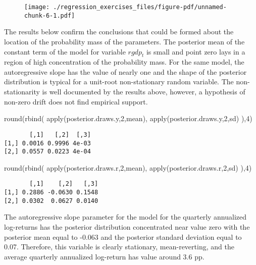 \documentclass[
  letterpaper,
  DIV=11,
  numbers=noendperiod]{scrreprt}
\newenvironment{Shaded}{\begin{snugshade}}{\end{snugshade}}
\newcommand{\DecValTok}[1]{\textcolor[rgb]{0.68,0.00,0.00}{#1}}
\newcommand{\FunctionTok}[1]{\textcolor[rgb]{0.28,0.35,0.67}{#1}}
\newcommand{\NormalTok}[1]{\textcolor[rgb]{0.00,0.23,0.31}{#1}}
\begin{document}
\begin{figure}[H]

{\centering \texttt{[image: ./regression\_exercises\_files/figure-pdf/unnamed-chunk-6-1.pdf]}

}

\end{figure}

The results below confirm the conclusions that could be formed about the
location of the probability mass of the parameters. The posterior mean
of the constant term of the model for variable \(rgdp_t\) is small and
point zero lays in a region of high concentration of the probability
mass. For the same model, the autoregressive slope has the value of
nearly one and the shape of the posterior distribution is typical for a
unit-root non-stationary random variable. The non-stationarity is well
documented by the results above, however, a hypothesis of non-zero drift
does not find empirical support.

\begin{Shaded}
\begin{Highlighting}[]
\FunctionTok{round}\NormalTok{(}\FunctionTok{rbind}\NormalTok{(}
  \FunctionTok{apply}\NormalTok{(posterior.draws.y,}\DecValTok{2}\NormalTok{,mean),}
  \FunctionTok{apply}\NormalTok{(posterior.draws.y,}\DecValTok{2}\NormalTok{,sd)}
\NormalTok{),}\DecValTok{4}\NormalTok{)}
\end{Highlighting}
\end{Shaded}

\begin{verbatim}
       [,1]   [,2]  [,3]
[1,] 0.0016 0.9996 4e-03
[2,] 0.0557 0.0223 4e-04
\end{verbatim}

\begin{Shaded}
\begin{Highlighting}[]
\FunctionTok{round}\NormalTok{(}\FunctionTok{rbind}\NormalTok{(}
  \FunctionTok{apply}\NormalTok{(posterior.draws.r,}\DecValTok{2}\NormalTok{,mean),}
  \FunctionTok{apply}\NormalTok{(posterior.draws.r,}\DecValTok{2}\NormalTok{,sd)}
\NormalTok{),}\DecValTok{4}\NormalTok{)}
\end{Highlighting}
\end{Shaded}

\begin{verbatim}
       [,1]    [,2]   [,3]
[1,] 0.2886 -0.0630 0.1548
[2,] 0.0302  0.0627 0.0140
\end{verbatim}

The autoregressive slope parameter for the model for the quarterly
annualized log-returns has the posterior distribution concentrated near
value zero with the posterior mean equal to -0.063 and the posterior
standard deviation equal to 0.07. Therefore, this variable is clearly
stationary, mean-reverting, and the average quarterly annualized
log-return has value around 3.6 pp.
\end{document}
